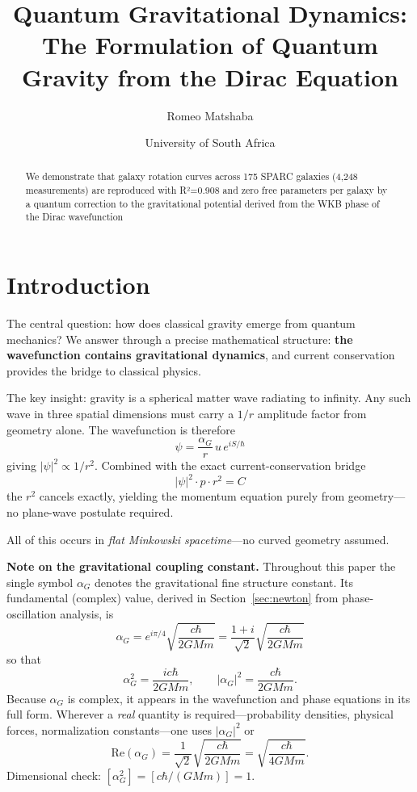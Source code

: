 \documentclass[11pt,a4paper]{article}
\title{Quantum Gravitational Dynamics:\\
	The Formulation of Quantum Gravity from the Dirac Equation}
\author{Romeo Matshaba}
\date{University of South Africa}
\theoremstyle{definition}
\theoremstyle{remark}
\begin{document}
	\maketitle
	
	\begin{abstract}
		We demonstrate that galaxy rotation curves across 175 SPARC galaxies (4,248 measurements) are reproduced with R²=0.908 and zero free parameters per galaxy by a quantum correction to the gravitational potential derived from the WKB phase of the Dirac wavefunction
	\end{abstract}
	
	\section{Introduction}
	
	The central question: how does classical gravity emerge from quantum mechanics? We answer through a precise mathematical structure: \textbf{the wavefunction contains gravitational dynamics}, and current conservation provides the bridge to classical physics.
	
	The key insight: gravity is a spherical matter wave radiating to infinity.  Any such wave in three spatial dimensions must carry a $1/r$ amplitude factor from geometry alone.  The wavefunction is therefore
	\begin{equation}
		\psi = \frac{\alpha_G}{r}\,u\,e^{iS/\hbar}
	\end{equation}
	giving $|\psi|^2 \propto 1/r^2$.  Combined with the exact current-conservation bridge
	\begin{equation}
		|\psi|^2 \cdot p \cdot r^2 = C
	\end{equation}
	the $r^2$ cancels exactly, yielding the momentum equation purely from geometry---no plane-wave postulate required.
	
	All of this occurs in \textit{flat Minkowski spacetime}---no curved geometry assumed.
	
	\bigskip
	\noindent\textbf{Note on the gravitational coupling constant.}
	Throughout this paper the single symbol $\alpha_G$ denotes the gravitational fine structure constant.  Its fundamental (complex) value, derived in Section~\ref{sec:newton} from phase-oscillation analysis, is
	\begin{equation}
		\boxed{\alpha_G = e^{i\pi/4}\sqrt{\frac{c\hbar}{2GMm}} = \frac{1+i}{\sqrt{2}}\sqrt{\frac{c\hbar}{2GMm}}}
		\label{eq:alphaG_def}
	\end{equation}
	so that
	\begin{equation}
		\alpha_G^2 = \frac{ic\hbar}{2GMm}, \qquad |\alpha_G|^2 = \frac{c\hbar}{2GMm}.
		\label{eq:alphaG_props}
	\end{equation}
	Because $\alpha_G$ is complex, it appears in the wavefunction and phase equations in its full form.  Wherever a \emph{real} quantity is required---probability densities, physical forces, normalization constants---one uses $|\alpha_G|^2$ or
	\begin{equation}
		\mathrm{Re}(\alpha_G) = \frac{1}{\sqrt{2}}\sqrt{\frac{c\hbar}{2GMm}} = \sqrt{\frac{c\hbar}{4GMm}}.
		\label{eq:alphaG_real}
	\end{equation}
	Dimensional check: $[\alpha_G^2] = [c\hbar/(GMm)] = 1$.~\checkmark
	
\end{document}
